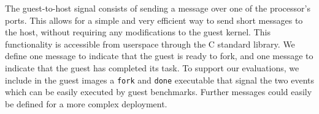 The guest-to-host signal consists of sending a message over one of the
processor's ports. This allows for a simple and very efficient way to send
short messages to the host, without requiring any modifications to the guest
kernel. This functionality is accessible from userspace through the C standard
library. We define one message to indicate that the guest is ready to fork, and
one message to indicate that the guest has completed its task. To support our
evaluations, we include in the guest images a \texttt{fork} and \texttt{done}
executable that signal the two events which can be easily executed by guest
benchmarks. Further messages could easily be defined for a more complex
deployment.

